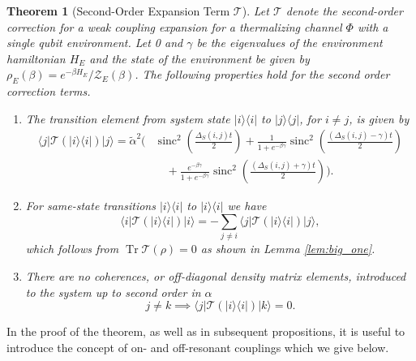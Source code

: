 \documentclass[
 amsmath,amssymb,
 aps,
onecolumn, 
nofootinbib]{revtex4-2}
\newtheorem{theorem}{Theorem}
\newcommand{\ket}[1]{|#1\rangle}
\newcommand{\bra}[1]{\langle #1|}
\newcommand{\ketbra}[2]{| #1\rangle\! \langle #2|}
\DeclareMathOperator{\Tr}{Tr}
\newcommand{\partfun}{\mathcal{Z}}
\DeclareMathOperator{\sinc}{sinc}
\begin{document}
\begin{theorem}[Second-Order Expansion Term $\mathcal{T}$] \label{thm:second_order_transition}
Let $\mathcal{T}$ denote the second-order correction for a weak coupling expansion for a thermalizing channel $\Phi$ with a single qubit environment. Let 0 and $\gamma$ be the eigenvalues of the environment hamiltonian $H_E$ and the state of the environment be given by $\rho_E(\beta) = e^{-\beta H_E} / \partfun_E(\beta)$. The following properties hold for the second order correction terms.
\begin{enumerate}
    \item 
The transition element from system state $\ketbra{i}{i}$ to $\ketbra{j}{j}$, for $i \neq j$, is given by
\begin{align}
    \bra{j}\mathcal{T}(\ketbra{i}{i}) \ket{j} = \widetilde{\alpha}^2 \Biggr(& \sinc^2 \left( \frac{\Delta_S(i,j)t}{2} \right) + \frac{1}{1 + e^{-\beta \gamma}} \sinc^2 \left( \frac{(\Delta_S(i,j) - \gamma)t}{2} \right) \nonumber\\
    &\quad+  \frac{e^{-\beta \gamma}}{1 + e^{-\beta \gamma}} \sinc^2 \left( \frac{(\Delta_S(i,j) + \gamma)t}{2} \right) \Biggr). \label{eq:transition_terms_total}
\end{align}
\item For same-state transitions $\ketbra{i}{i}$ to $\ketbra{i}{i}$ we have
\begin{equation}
    \bra{i}\mathcal{T}(\ketbra{i}{i})\ket{i} = - \sum_{j \neq i} \bra{j} \mathcal{T}(\ketbra{i}{i}) \ket{j},
\end{equation}
which follows from $\Tr \mathcal{T}(\rho) = 0$ as shown in Lemma \ref{lem:big_one}. 
\item There are no coherences, or off-diagonal density matrix elements, introduced to the system up to second order in $\alpha$
\begin{equation}
    j \neq k \implies \bra{j} \mathcal{T}(\ketbra{i}{i}) \ket{k} = 0.
\end{equation}

\end{enumerate}
\end{theorem}
In the proof of the theorem, as well as in subsequent propositions, it is useful to introduce the concept of on- and off-resonant couplings which we give below.
\end{document}
